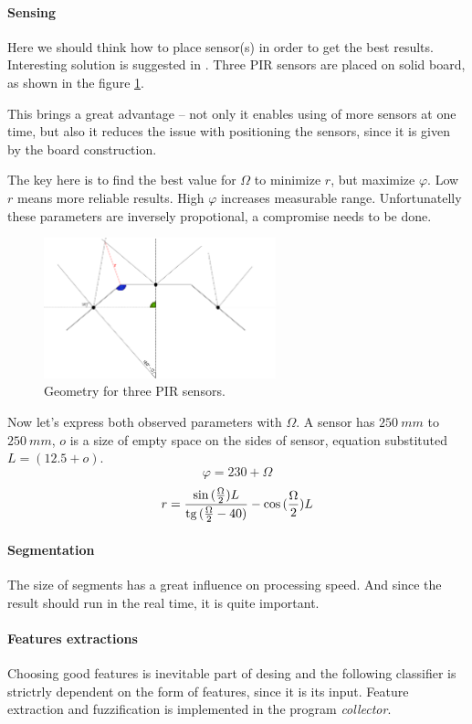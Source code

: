 \paragraph{Sensing}
Here we should think how to place sensor(s) in order to get the best results.
Interesting solution is suggested in \cite{GestureControl}. Three PIR sensors are
placed on solid board, as shown in the figure \ref{fig:3pir_geometry}.

This brings a great advantage -- not only it enables using of more sensors at one time, but
also it reduces the issue with positioning the sensors, since it is given by the
board construction.

The key here is to find the best value for $\Omega$ to minimize $r$, but maximize
$\varphi$. Low $r$ means more reliable results. High $\varphi$ increases measurable range.
Unfortunatelly these parameters are inversely propotional, a compromise needs to be done.

\begin{figure}[h!]
\begin{center}
\includegraphics[width=0.6\textwidth]{obrazky-figures/3pir_geometry.png}
\caption{Geometry for three PIR sensors.\label{fig:3pir_geometry}}
\end{center}
\end{figure}

Now let's express both observed parameters with $\Omega$. A sensor has $250~mm$ to $250~mm$,
$o$ is a size of empty space on the sides of sensor, equation substituted $L = (12.5 + o)$.
$$\varphi = 230 + \Omega$$
$$r = \frac{\sin{(\frac{\Omega}{2})}L}{\tg{(\frac{\Omega}{2}-40)}} - \cos{(\frac{\Omega}{2})}L$$


\paragraph{Segmentation}
The size of segments has a great influence on processing speed. And since the
result should run in the real time, it is quite important.

\paragraph{Features extractions}
Choosing good features is inevitable part of desing and the following classifier
is strictrly dependent on the form of features, since it is its input. Feature extraction
and fuzzification is implemented in the program {\it collector}.

